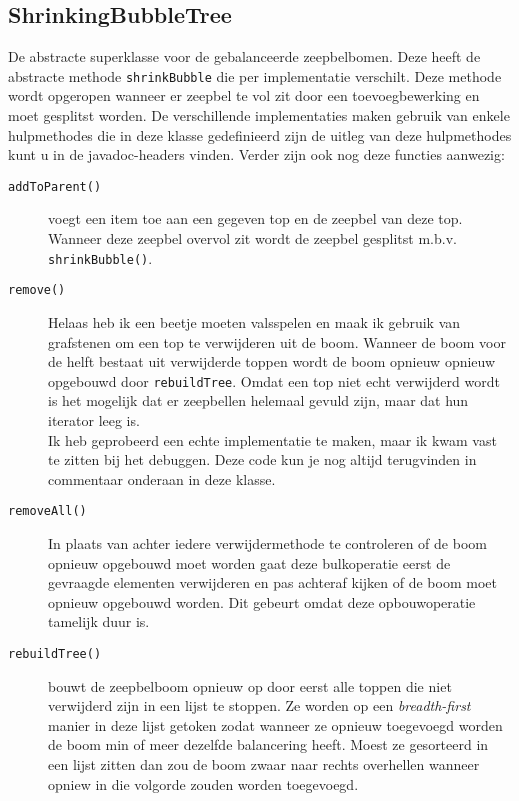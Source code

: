 \documentclass[12pt,hidelinks]{article}
\begin{document}
    \subsection{ShrinkingBubbleTree}
    De abstracte superklasse voor de gebalanceerde zeepbelbomen. Deze heeft de abstracte methode {\tt shrinkBubble} die per implementatie verschilt.
    Deze methode wordt opgeropen wanneer er zeepbel te vol zit door een toevoegbewerking en moet gesplitst worden.
    De verschillende implementaties maken gebruik van enkele hulpmethodes die in deze klasse gedefinieerd zijn de uitleg van deze hulpmethodes kunt u in de javadoc-headers vinden.
    Verder zijn ook nog deze functies aanwezig:
    \begin{description}
        \item[\tt addToParent()] voegt een item toe aan een gegeven top en de zeepbel van deze top.
            Wanneer deze zeepbel overvol zit wordt de zeepbel gesplitst m.b.v. {\tt shrinkBubble()}.
        \item[\tt remove()] Helaas heb ik een beetje moeten valsspelen en maak ik gebruik van grafstenen om een top te verwijderen uit de boom.
            Wanneer de boom voor de helft bestaat uit verwijderde toppen wordt de boom opnieuw opnieuw opgebouwd door {\tt rebuildTree}.
            Omdat een top niet echt verwijderd wordt is het mogelijk dat er zeepbellen helemaal gevuld zijn, maar dat hun iterator leeg is.
            \\
            Ik heb geprobeerd een echte implementatie te maken, maar ik kwam vast te zitten bij het debuggen. Deze code kun je nog altijd terugvinden in
            commentaar onderaan in deze klasse.
        \item[\tt removeAll()] In plaats van achter iedere verwijdermethode te controleren of de boom opnieuw opgebouwd moet worden gaat deze bulkoperatie
            eerst de gevraagde elementen verwijderen en pas achteraf kijken of de boom moet opnieuw opgebouwd worden. Dit gebeurt omdat deze opbouwoperatie
            tamelijk duur is.
        \item[\tt rebuildTree()] bouwt de zeepbelboom opnieuw op door eerst alle toppen die niet verwijderd zijn in een lijst te stoppen. Ze worden op een \textit{breadth-first} manier
            in deze lijst getoken zodat wanneer ze opnieuw toegevoegd worden de boom min of meer dezelfde balancering heeft. Moest ze gesorteerd in een lijst zitten dan zou de boom
            zwaar naar rechts overhellen wanneer opniew in die volgorde zouden worden toegevoegd.
    \end{description}
\end{document}
